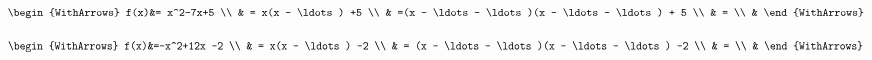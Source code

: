 \documentclass[main.tex]{subfiles}
\begin{document}
\begin{example}[complétion au carré cas $a=1$]
\noindent
\parbox{0.45\linewidth}{
\noindent
$\begin{WithArrows}
	f(x)&= x^2-7x+5 \\
	& = x(x - \ldots) +5  \\
	& =(x - \ldots - \ldots)(x - \ldots - \ldots) + 5 \\
	& = \\
	&  
\end{WithArrows}$
}	\hfill 
\parbox{0.45\linewidth}{
\noindent
$\begin{WithArrows}
	f(x)&=-x^2+12x -2 \\
	& = x(x - \ldots) -2  \\
	& = (x - \ldots - \ldots)(x - \ldots - \ldots) -2  \\
	& = \\
	&  
\end{WithArrows}$
}	
\end{example}
	
\end{document}
